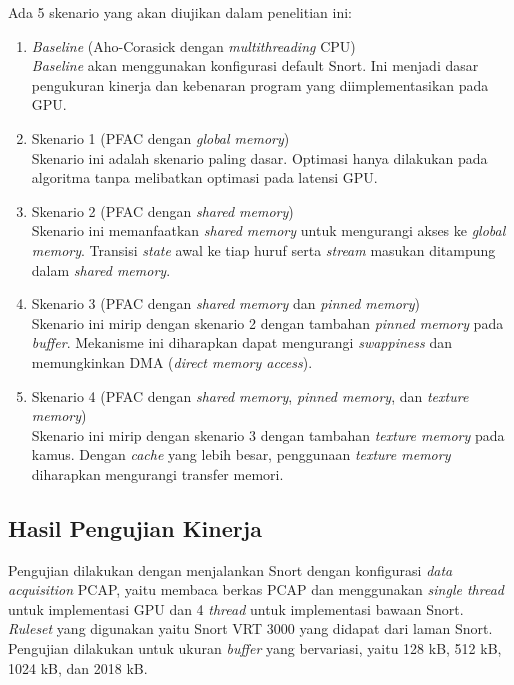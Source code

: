 \documentclass[conference]{IEEEtran}
\begin{document}
        Ada 5 skenario yang akan diujikan dalam penelitian ini: 
        \begin{enumerate}
        
            \item \emph{Baseline} (Aho-Corasick dengan \emph{multithreading} CPU) \\
            \emph{Baseline} akan menggunakan konfigurasi default Snort. Ini menjadi dasar pengukuran kinerja dan kebenaran program yang diimplementasikan pada GPU.

            \item Skenario 1 (PFAC dengan \emph{global memory}) \\
            Skenario ini adalah skenario paling dasar. Optimasi hanya dilakukan pada algoritma tanpa melibatkan optimasi pada latensi GPU.

            \item Skenario 2 (PFAC dengan \emph{shared memory}) \\
            Skenario ini memanfaatkan \emph{shared memory} untuk mengurangi akses ke \emph{global memory}. Transisi \emph{state} awal ke tiap huruf serta \emph{stream} masukan ditampung dalam \emph{shared memory}.

            \item Skenario 3 (PFAC dengan \emph{shared memory} dan \emph{pinned memory}) \\
            Skenario ini mirip dengan skenario 2 dengan tambahan \emph{pinned memory} pada \emph{buffer}. Mekanisme ini diharapkan dapat mengurangi \emph{swappiness} dan memungkinkan DMA (\emph{direct memory access}).

            \item Skenario 4 (PFAC dengan \emph{shared memory}, \emph{pinned memory}, dan \emph{texture memory}) \\
            Skenario ini mirip dengan skenario 3 dengan tambahan \emph{texture memory} pada kamus. Dengan \emph{cache} yang lebih besar, penggunaan \emph{texture memory} diharapkan mengurangi transfer memori.

        \end{enumerate}
        
    \subsection{Hasil Pengujian Kinerja}
        Pengujian dilakukan dengan menjalankan Snort dengan konfigurasi \emph{data acquisition} PCAP, yaitu membaca berkas PCAP dan menggunakan \emph{single thread} untuk implementasi GPU dan 4 \emph{thread} untuk implementasi bawaan Snort. \emph{Ruleset} yang digunakan yaitu Snort VRT 3000 yang didapat dari laman Snort. Pengujian dilakukan untuk ukuran \emph{buffer} yang bervariasi, yaitu 128 kB, 512 kB, 1024 kB, dan 2018 kB.
\end{document}
